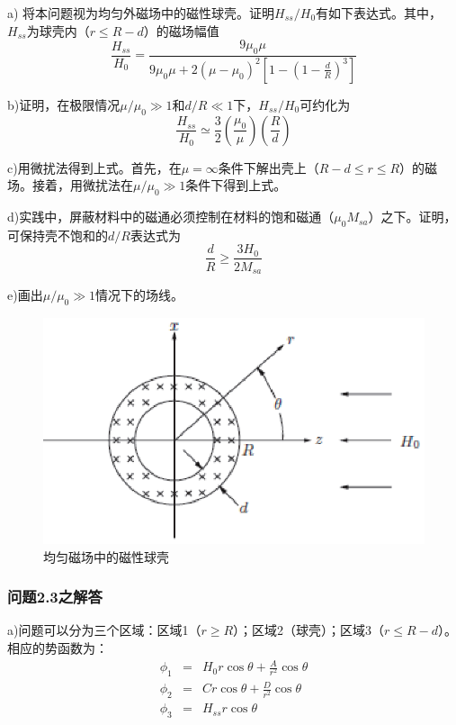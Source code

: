 a) 将本问题视为均匀外磁场中的磁性球壳。证明$H_{ss}/H_0$有如下表达式。其中，$H_{ss}$为球壳内（$r\le R-d$）的磁场幅值
\begin{equation}
\frac{H_{ss}}{H_0}=\frac{9\mu_0 \mu}{9\mu_0 \mu+2(\mu-\mu_0)^2\left[1-\left(1-\frac{d}{R}\right)^3\right]}
\end{equation}

b)证明，在极限情况$\mu/\mu_0\gg 1$和$d/R\ll 1$下，$H_{ss}/H_0$可约化为
\begin{equation}
\frac{H_{ss}}{H_0}\simeq \frac{3}{2}(\frac{\mu_0}{\mu})(\frac{R}{d})
\end{equation}

c)用微扰法得到上式。首先，在$\mu=\infty$条件下解出壳上（$R-d\le r\le R$）的磁场。接着，用微扰法在$\mu/\mu_0 \gg 1$条件下得到上式。

d)实践中，屏蔽材料中的磁通必须控制在材料的饱和磁通（$\mu_0 M_{sa}$）之下。证明，可保持壳不饱和的$d/R$表达式为
\begin{equation}
\frac{d}{R} \ge \frac{3H_0}{2M_{sa}}
\end{equation}

e)画出$\mu/\mu_0 \gg 1$情况下的场线。

\begin{figure}
  \centering
 \includegraphics[scale=0.9]{chpt2/figs/fig2.4.eps}
  \caption{均匀磁场中的磁性球壳}
\end{figure}

\subsubsection*{问题2.3之解答}
a)问题可以分为三个区域：区域1（$r\ge R$）；区域2（球壳）；区域3（$r\le R-d$）。相应的势函数为：
\begin{eqnarray*}
  \phi_1 &=& H_0 r\cos\theta+\frac{A}{r^2}\cos\theta \\
  \phi_2 &=& C r \cos\theta+\frac{D}{r^2}\cos\theta \\
  \phi_3 &=& H_{ss} r\cos\theta
\end{eqnarray*}

